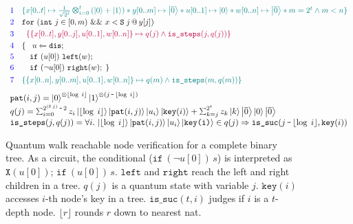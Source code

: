 \begin{figure}[t]
{\centering
{\small
\[
\begin{array}{r l}
\textcolor{blue}{1}
&
\textcolor{teal}{
\{ x[0..t] \mapsto \shadi{2^t}{t}{} *
   y[0..m] \mapsto \ket{\overline{0}} *
   u[0..1] \mapsto \ket{0} *
   w[0..n] \mapsto \ket{\overline{0}} * m = 2^t \wedge m < n\}
}
\\[0.3em]
\textcolor{blue}{2}
&
\texttt{for}~{(\texttt{int}~j \in [0,m)~\&\&~x < \snext{j} \,@\, y[j])}
\\[0.3em]

\textcolor{blue}{3}
&
\;\;
\textcolor{purple}{\{ \{x[0..t],y[0..j],u[0..1],w[0..n]\} \mapsto q(j) \wedge \texttt{is\_steps}(j,q(j)) \}}
\\[0.3em]

\textcolor{blue}{4}
&
\{
\;\;\;
\ssassign{u}{}{\sdis};
\\[0.2em]

\textcolor{blue}{5}
&
\quad
\sifq{u[0]}{\texttt{left}(w)};
\\[0.2em]

\textcolor{blue}{6}
&
\quad
\sifq{\neg u[0]}{\texttt{right}(w)}; \;\}
\\[0.4em]

\textcolor{blue}{7}
&
\textcolor{teal}{
\{ \{x[0..n],y[0..m],u[0..1],w[0..n]\} \mapsto q(m) \wedge \texttt{is\_steps}(m,q(m)) \}
}
\end{array}
\]
}
{\footnotesize
$
\begin{array}{l}
\texttt{pat}(i,j) = \ket{0}^{\otimes \lfloor\log\;i \rfloor}\ket{1}^{\otimes (j\,\sminus\,\lfloor\log\;i \rfloor)}\\[0.1em]

q(j)=\schai{2^{(\snext{j})}\,\sminus\,2}{z_i}{\lfloor\log\;i \rfloor}{\ket{\texttt{pat}(i,j)}\ket{u_i}\ket{\texttt{key}(i)}} + \ssum{k=j}{2^t}{z_k\ket{k}\ket{\overline{0}}\ket{0}\ket{\overline{0}}}
\\[0.1em]
\texttt{is\_steps}(j,q(j))=
\forall i.\, \ket{\lfloor\log\;i \rfloor}\ket{\texttt{pat}(i,j)}\ket{u_i}\ket{\texttt{key(i)}} \in q(j)
\Rightarrow \texttt{is\_suc}(j\,\sminus\,\lfloor\log\;i \rfloor,\texttt{key}(i))
  \end{array}
$
}
}
\caption{Quantum walk reachable node verification for a complete binary tree. As a circuit, the conditional ($\texttt{if}~(\neg u[0]) \,s$) is interpreted as $\texttt{X}(u[0]);\,\texttt{if}~(u[0])\,s$. $\texttt{left}$ and $\texttt{right}$ reach the left and right children in a tree. $q(j)$ is a quantum state with variable $j$. $\texttt{key}(i)$ accesses $i$-th node's key in a tree.
$\texttt{is\_suc}(t,i)$ judges if $i$ is a $t$-depth node. $\lfloor r \rfloor$ rounds $r$ down to nearest nat. }
\label{fig:background-circuit-example-walk}
\end{figure}

